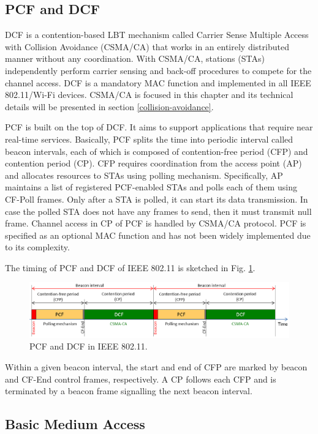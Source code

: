 \subsection{PCF and DCF}
\label{pcf-dcf}

DCF is a contention-based LBT mechanism called Carrier Sense Multiple Access with Collision Avoidance (CSMA/CA) that works in an entirely distributed manner without any coordination. With CSMA/CA, stations (STAs) independently perform carrier sensing and back-off procedures to compete for the channel access. DCF is a mandatory MAC function and implemented in all IEEE 802.11/\mbox{Wi-Fi} devices. CSMA/CA is focused in this chapter and its technical details will be presented in section \ref{collision-avoidance}.

PCF is built on the top of DCF. It aims to support applications that require near real-time services. Basically, PCF splits the time into periodic interval called beacon intervals, each of which is composed of contention-free period (CFP) and contention period (CP). CFP requires coordination from the access point (AP) and allocates resources to STAs using polling mechanism. Specifically, AP maintains a list of registered PCF-enabled STAs and polls each of them using CF-Poll frames. Only after a STA is polled, it can start its data transmission. In case the polled STA does not have any frames to send, then it must transmit null frame. Channel access in CP of PCF is handled by CSMA/CA protocol. PCF is specified as an optional MAC function and has not been widely implemented due to its complexity.

The timing of PCF and DCF of IEEE 802.11 is sketched in Fig. \ref{figs:802-11-PCF-DCF}. 
\begin{figure}[!ht]
	\centering
	\includegraphics[width=1.0\columnwidth]{figs/802-11-PCF-DCF}
	\caption{PCF and DCF in IEEE 802.11.}
	\label{figs:802-11-PCF-DCF}
\end{figure}
Within a given beacon interval, the start and end of CFP are marked by beacon and CF-End control frames, respectively. A CP follows each CFP and is terminated by a beacon frame signalling the next beacon interval. 

\subsection{Basic Medium Access}
\label{basic-medium-access}

